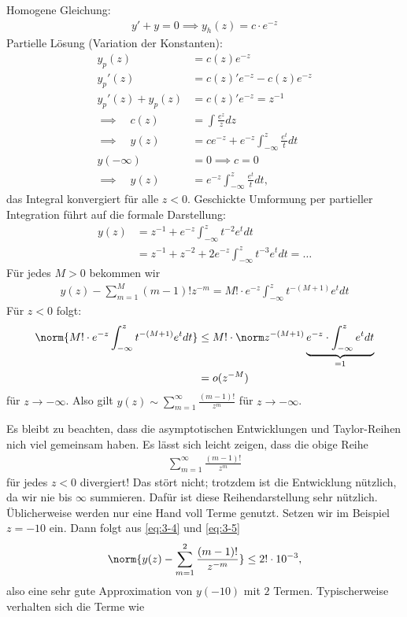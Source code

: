 \begin{beispiel}
Homogene Gleichung:
\begin{align*}
  y' + y = 0\implies y_{h}(z) = c\cdot e^{-z}
\end{align*}
Partielle Lösung (Variation der Konstanten):
\begin{align*}
  y_{p}(z) &= c(z)e^{-z}\\
  y_{p}'(z) &= c(z)'e^{-z} - c(z)e^{-z}\\
  y_{p}'(z) + y_{p}(z) &= c(z)'e^{-z}  = z^{-1}\\
\implies \quad c(z) &= \int \frac {e^{z}} z dz\\
\implies \quad y(z) &= c e^{-z} + e^{-z} \int_{- \infty}^{z} \frac{e^{t}}{t}dt\\
 y(-\infty)&= 0 \implies c = 0\\
\implies \quad y(z) &= e^{-z} \int_{- \infty}^{z} \frac{e^{t}}{t}dt, 
\end{align*}
das Integral konvergiert für alle $z < 0$. Geschickte Umformung per partieller Integration führt auf die formale Darstellung:
\begin{align*}
  y(z) &= z^{-1} + e^{-z} \int_{-\infty}^{z} t^{-2} e^{t}dt\\
&= z^{-1} + z^{-2} + 2e^{-z} \int_{-\infty}^{z} t^{-3} e^{t}dt = \dots 
\end{align*}
Für jedes $M> 0$ bekommen wir
\begin{align}\label{eq:3-4}
  y(z) - \sum_{m = 1}^{M}(m-1)! z^{-m} = M! \cdot e^{-z} \int_{-\infty}^{z}t^{-(M+1)}e^{t}dt
\end{align}
Für $z <0$ folgt:
\begin{align}\label{eq:3-5}
  \norm {M! \cdot e^{-z} \int_{- \infty}^{z} t^{-(M+1)} e^{t}dt}&\leq M!\cdot \norm z^{-(M+1)}\underbrace{e^{-z}\cdot\int_{-\infty}^{z}e^{t}dt}_{= 1}\\
&= o(z^{-M})\notag
\end{align}
für $z \to -\infty$. Also gilt $y(z) \sim \sum_{m = 1}^{\infty} \frac{(m-1)!}{z^{m}}$ für $z \to -\infty$.
\end{beispiel}
Es bleibt zu beachten, dass die asymptotischen Entwicklungen und Taylor-Reihen nich viel gemeinsam haben. Es lässt sich leicht zeigen, dass die obige Reihe
\begin{align*}
  \sum_{ m = 1}^{\infty} \frac{(m-1)!}{z^{m}}
\end{align*}
für jedes $z < 0$ divergiert! Das stört nicht; trotzdem ist die Entwicklung nützlich, da wir nie bis $\infty$ summieren. Dafür ist diese Reihendarstellung sehr nützlich. Üblicherweise werden nur eine Hand voll Terme genutzt. Setzen wir im Beispiel $z  = - 10$ ein. Dann folgt aus \eqref{eq:3-4} und \eqref{eq:3-5}
\begin{align*}
  \norm{y(z) - \sum_{m = 1}^{2}\frac{(m-1)!} {z^{-m}}} \leq 2! \cdot 10^{-3}, 
\end{align*}
also eine sehr gute Approximation von $y(-10)$ mit $2$ Termen. Typischerweise verhalten sich die Terme wie 

